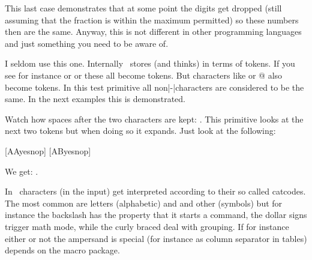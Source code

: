 \typebuffer[option=TEX]

\startlines
\getbuffer
\stoplines

\startbuffer
\ifdim \dimexpr1.999999 pt/2\relax = \dimexpr 1.9999995 pt/2\relax
    the same \else different
\fi
\ifdim \dimexpr1.999999 pt:2\relax = \dimexpr 1.9999995 pt:2\relax
    the same \else different
\fi
\stopbuffer

\typebuffer[option=TEX]

\startlines
\getbuffer
\stoplines

This last case demonstrates that at some point the digits get dropped (still
assuming that the fraction is within the maximum permitted) so these numbers then
are the same. Anyway, this is not different in other programming languages and
just something you need to be aware of.

\stopsectionlevel

\stopsectionlevel

\startsectionlevel[title={\TEX\ primitives}]

\startsectionlevel[title={\tex{if}}]

I seldom use this one. Internally \TEX\ stores (and thinks) in terms of tokens.
If you see for instance \type {\def} or \type {\dimen} or \type {\hbox} these all
become tokens. But characters like  or {@} also become tokens. In this
test primitive all non|-|characters are considered to be the same. In the next
examples this is demonstrated.

\stopbuffer

\typebuffer[option=TEX]

Watch how spaces after the two characters are kept: \inlinebuffer . This primitive looks
at the next two tokens but when doing so it expands. Just look at the following:

\startbuffer
\def\AA{AA}%
\def\AB{AB}%
[\if\AA yes\else nop\fi]
[\if\AB yes\else nop\fi]
\stopbuffer

\typebuffer[option=TEX]

We get: \inlinebuffer .


\stopsectionlevel

\startsectionlevel[title={\tex{ifcat}}]

In \TEX\ characters (in the input) get interpreted according to their so called
catcodes. The most common are letters (alphabetic) and and other (symbols) but
for instance the backslash has the property that it starts a command, the dollar
signs trigger math mode, while the curly braced deal with grouping. If for
instance either or not the ampersand is special (for instance as column separator
in tables) depends on the macro package.

